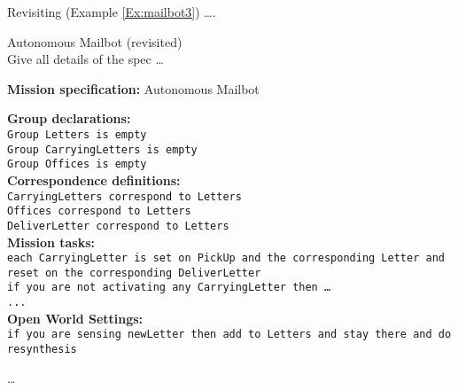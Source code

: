 Revisiting (Example \ref{Ex:mailbot3}) \ldots. 

\begin{myExample}\label{Ex:mailbot3} Autonomous Mailbot (revisited)\\
	Give all details of the spec \ldots
\end{myExample}

\begin{algorithm}
	\textbf{Mission specification:} Autonomous Mailbot\\
	{\small
	
	\textbf{Group declarations:}\\
	\texttt{Group Letters is empty}\\
	\texttt{Group CarryingLetters is empty}\\
	\texttt{Group Offices is empty}\\
	
	\textbf{Correspondence definitions:}\\
	\texttt{CarryingLetters correspond to Letters}\\
	\texttt{Offices correspond to Letters}\\
	\texttt{DeliverLetter correspond to Letters}\\
	
	\textbf{Mission tasks:}\\
	\texttt{each CarryingLetter is set on PickUp and the corresponding Letter and reset on the corresponding DeliverLetter}\\
	
	\texttt{if you are not activating any CarryingLetter then \ldots}\\
	\texttt{...}\\
	
	\textbf{Open World Settings:}\\
	\texttt{if you are sensing newLetter then add to Letters and stay there and do resynthesis} 
	}
\end{algorithm}

\ldots

